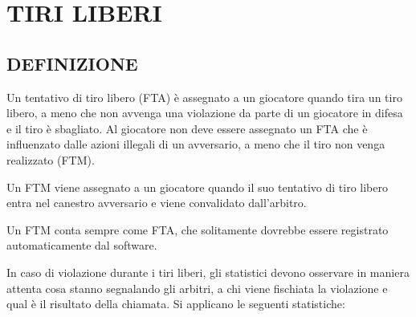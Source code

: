\section{TIRI LIBERI}
\sectionline

\subsection{DEFINIZIONE}
\subsectionline

Un tentativo di tiro libero (FTA) è assegnato a un giocatore quando tira un tiro libero, a meno che non avvenga una violazione da parte di un giocatore in difesa e il tiro è sbagliato. Al giocatore non deve essere assegnato un FTA che è influenzato dalle azioni illegali di un avversario, a meno che il tiro non venga realizzato (FTM).

Un FTM viene assegnato a un giocatore quando il suo tentativo di tiro libero entra nel canestro avversario e viene convalidato dall'arbitro.

Un FTM conta sempre come FTA, che solitamente dovrebbe essere registrato automaticamente dal software.

In caso di violazione durante i tiri liberi, gli statistici devono osservare in maniera attenta cosa stanno segnalando gli arbitri, a chi viene fischiata la violazione e qual è il risultato della chiamata. Si applicano le seguenti statistiche:

